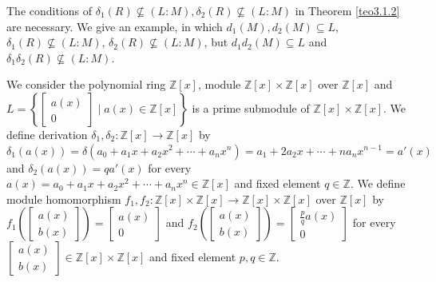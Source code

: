 \documentclass{arxiv}
\begin{document}
The conditions of $\delta_1(R) \nsubseteq (L:M), \delta_2(R) \nsubseteq (L:M)$ 
in Theorem \ref{teo3.1.2} are necessary. We give an example, in which $d_1(M) , d_2 (M) \subseteq L$, 
$\delta_1(R) \nsubseteq (L:M)$, 
$ \delta_2(R) \nsubseteq (L:M)$, but   $d_1d_2(M) \subseteq L$ and $\delta_1 \delta_2 (R) \nsubseteq (L:M)$.
\begin{example}\label{example2.3}
    We consider the polynomial ring $\mathbb{Z}[x]$, module  $\mathbb{Z}[x] \times \mathbb{Z}[x]$ over $\mathbb{Z}[x]$ and $L = \left\{ \begin{bmatrix}
        a(x)\\
        0
    \end{bmatrix} \mid a(x) \in \mathbb{Z}[x] \right\}$ is a prime submodule of $\mathbb{Z}[x] \times \mathbb{Z}[x]$. We define derivation $\delta_1,\delta_2:\mathbb{Z}[x] \rightarrow \mathbb{Z}[x]$ by $\delta_1(a(x))=\delta(a_0+a_1x+a_2x^2+\cdots +a_nx^n)=a_1+2a_2x+\cdots+na_nx^{n-1}=a'(x)$ and $\delta_2(a(x))=qa'(x)$ for every $a(x)=a_0+a_1x+a_2x^2+\cdots+a_nx^n \in \mathbb{Z}[x]$ and fixed element $q \in \mathbb{Z}$. 
    We define  module homomorphism $f_1,f_2:\mathbb{Z}[x] \times \mathbb{Z}[x] \rightarrow \mathbb{Z}[x] \times \mathbb{Z}[x]$ over $\mathbb{Z}[x]$ by $f_1 \left( \begin{bmatrix}
        a(x)\\
        b(x)
    \end{bmatrix} \right) = \begin{bmatrix}
        a(x)\\
        0
    \end{bmatrix}$ and $f_2 \left( \begin{bmatrix}
        a(x)\\
        b(x)
    \end{bmatrix} \right) =\begin{bmatrix}
        \frac{p}{q} a(x)\\
         0
    \end{bmatrix}$ for every $\begin{bmatrix}
        a(x)\\
        b(x)
    \end{bmatrix} \in \mathbb{Z}[x] \times \mathbb{Z}[x]$ and fixed element $p,q \in \mathbb{Z}$. 
    

\end{example}
\end{document}
